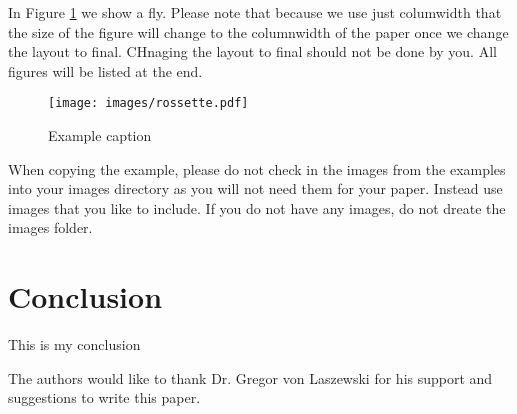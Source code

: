 \documentclass[sigconf]{acmart}
\begin{document}
In Figure \ref{f:fly} we show a fly. Please note that because we use
just columwidth that the size of the figure will change to the
columnwidth of the paper once we change the layout to final. CHnaging
the layout to final should not be done by you. All figures will be
listed at the end.

\begin{figure}[!ht]
  \centering\texttt{[image: images/rossette.pdf]}
  \caption{Example caption}\label{f:fly}
\end{figure}

When copying the example, please do not check in the images from the
examples into your images directory as you will not need them for your
paper. Instead use images that you like to include. If you do not have
any images, do not dreate the images folder.

\section{Conclusion}

This is my conclusion

\begin{acks}

  The authors would like to thank Dr. Gregor von Laszewski for his
  support and suggestions to write this paper.

\end{acks}


 

\appendix


\end{document}
